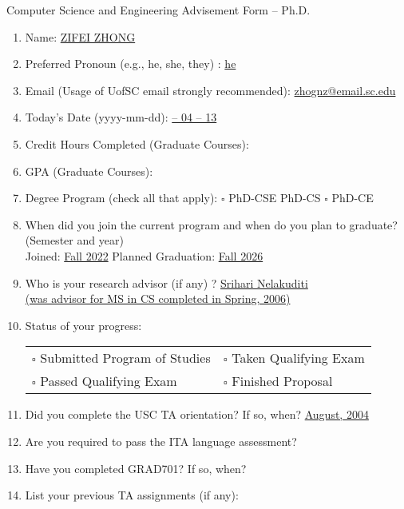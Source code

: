 \documentclass[11pt, oneside]{article}   	%
\begin{document}
\newpage
\centering \Large Computer Science and Engineering Advisement Form -- Ph.D.

\vspace{30pt}

\begin{enumerate}
\item Name: \underline{\quad ZIFEI ZHONG \quad}
\item Preferred Pronoun (e.g., he, she, they) : \underline{\quad he \quad}
\item Email (Usage of UofSC email strongly recommended): \underline{\quad zhognz@email.sc.edu \quad}
\item Today's Date (yyyy-mm-dd): \underline{ -- 04 -- 13 \quad}
\item Credit Hours Completed (Graduate Courses): \underline{ \quad}
\item GPA (Graduate Courses): \underline{ \quad}
\item Degree Program (check all that apply): $\square$ PhD-CSE \quad \makebox[0pt][l]{$\square$}\raisebox{.15ex}{\hspace{0.1em}$\checkmark$}  PhD-CS \quad $\square$ PhD-CE
\item When did you join the current program and when do you plan to graduate? (Semester and year)\\
 Joined: \underline{\quad Fall 2022\quad } \qquad Planned Graduation: \underline{\quad Fall 2026\quad}
\item Who is your research advisor (if any) ? \underline{\quad Srihari Nelakuditi \quad }\\
\underline{\quad (was advisor for MS in CS completed in Spring, 2006) \quad}
\item Status of your progress:\\
\begin{tabular}{l l}
$\square$ Submitted Program of Studies & $\square$ Taken Qualifying Exam\\
$\square$ Passed Qualifying Exam & $\square$ Finished Proposal
\end{tabular}
\item Did you complete the USC TA orientation? If so, when? \underline{\qquad August, 2004\qquad}
\item Are you required to pass the ITA language assessment? \underline{\qquad\qquad}
\item Have you completed GRAD701? If so, when? \underline{\qquad\qquad}
\item List your previous TA assignments (if any): 


\end{enumerate}
\end{document}
